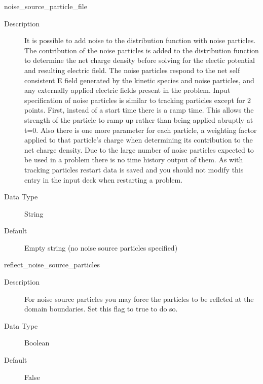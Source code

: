 \documentclass[11pt]{amsart}
\begin{document}
noise\_source\_particle\_file
\begin{description}
\item [Description] It is possible to add noise to the distribution function
with noise particles.  The contribution of the noise particles is added to the
distribution function to determine the net charge density before solving for the
electic potential and resulting electric field.  The noise particles respond to
the net self consistent E field generated by the kinetic species and noise
particles, and any externally applied electric fields present in the problem.
Input specification of noise particles is similar to tracking particles except
for 2 points.  First, instead of a start time there is a ramp time.  This allows
the strength of the particle to ramp up rather than being applied abruptly at
t=0.  Also there is one more parameter for each particle, a weighting factor
applied to that particle's charge when determining its contribution to the net
charge density.  Due to the large number of noise particles expected to be used
in a problem there is no time history output of them.  As with tracking
particles restart data is saved and you should not modify this entry in the
input deck when restarting a problem.
\item [Data Type] String
\item [Default] Empty string (no noise source particles specified)
\end{description}

reflect\_noise\_source\_particles
\begin{description}
\item [Description] For noise source particles you may force the particles to
be reflcted at the domain boundaries.  Set this flag to true to do so.
\item [Data Type] Boolean
\item [Default] False
\end{description}
\end{document}
